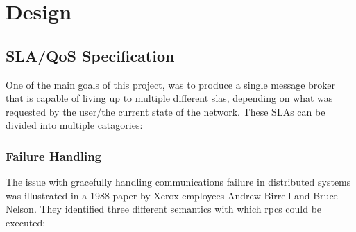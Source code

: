\section{Design}
\label{sec:Design}

\subsection{SLA/QoS Specification}
\label{sub:SLA/QoS Specification}

One of the main goals of this project, was to produce a single message broker that
is capable of living up to multiple different \glspl{sla}, depending on what was
requested by the user/the current state of the network. These SLAs can be divided
into multiple catagories:

\subsubsection{Failure Handling}
\label{subs:Failure Handling}

The issue with gracefully handling communications failure in distributed systems
was illustrated in a 1988 paper by Xerox employees
Andrew Birrell and Bruce Nelson\cite{Birrell:1988:IRP:59309.59336}. They identified
three different semantics with which \glspl{rpc} could be executed:

